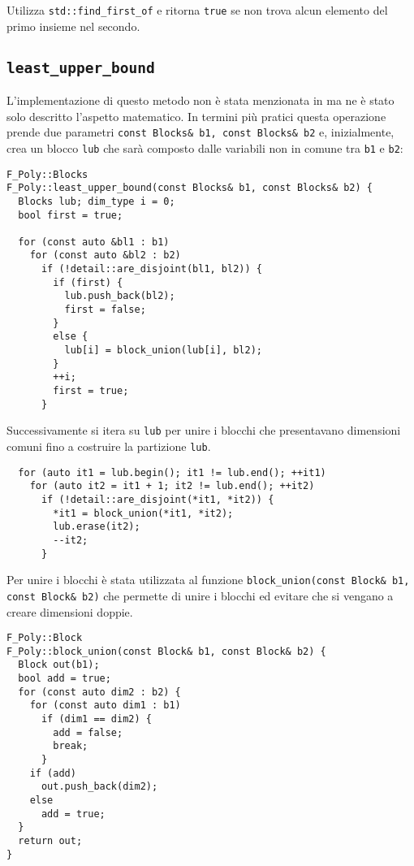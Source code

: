 \documentclass{mimosis}
\theoremstyle{definition}
\begin{document}
Utilizza \texttt{std::find\_first\_of} e ritorna \texttt{true} se non trova alcun elemento del
primo insieme nel secondo.

\subsection{\texttt{least\_upper\_bound}}
\label{sec:orgb3dec4a}
L'implementazione di questo metodo non è stata menzionata in \cite{fastpoly} ma
ne è stato solo descritto l'aspetto matematico. In termini più pratici questa
operazione prende due parametri \texttt{const Blocks\& b1, const Blocks\& b2} e,
inizialmente, crea un blocco \texttt{lub} che sarà composto dalle variabili non in
comune tra \texttt{b1} e \texttt{b2}:

\lstset{style=mystyle,language=C++,label= ,caption= ,captionpos=b,numbers=none}
\begin{lstlisting}
F_Poly::Blocks
F_Poly::least_upper_bound(const Blocks& b1, const Blocks& b2) {
  Blocks lub; dim_type i = 0;
  bool first = true;

  for (const auto &bl1 : b1)
    for (const auto &bl2 : b2)
      if (!detail::are_disjoint(bl1, bl2)) {
        if (first) {
          lub.push_back(bl2);
          first = false;
        }
        else {
          lub[i] = block_union(lub[i], bl2);
        }
        ++i;
        first = true;
      }
\end{lstlisting}

Successivamente si itera su \texttt{lub} per unire i blocchi che presentavano
dimensioni comuni fino a costruire la partizione \texttt{lub}.

\lstset{style=mystyle,language=C++,label= ,caption= ,captionpos=b,numbers=none}
\begin{lstlisting}
  for (auto it1 = lub.begin(); it1 != lub.end(); ++it1)
    for (auto it2 = it1 + 1; it2 != lub.end(); ++it2)
      if (!detail::are_disjoint(*it1, *it2)) {
        *it1 = block_union(*it1, *it2);
        lub.erase(it2);
        --it2;
      }
\end{lstlisting}

Per unire i blocchi è stata utilizzata al funzione \texttt{block\_union(const Block\& b1,
const Block\& b2)} che permette di unire i blocchi ed evitare che si vengano a
creare dimensioni doppie.

\lstset{style=mystyle,language=C++,label= ,caption= ,captionpos=b,numbers=none}
\begin{lstlisting}
F_Poly::Block
F_Poly::block_union(const Block& b1, const Block& b2) {
  Block out(b1);
  bool add = true;
  for (const auto dim2 : b2) {
    for (const auto dim1 : b1)
      if (dim1 == dim2) {
        add = false;
        break;
      }
    if (add)
      out.push_back(dim2);
    else
      add = true;
  }
  return out;
}
\end{lstlisting}
\end{document}
